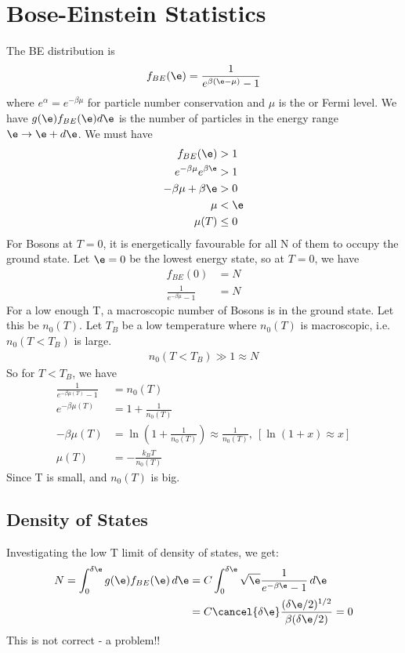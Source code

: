 \documentclass[a4paper, 11pt, normalem]{report}
\begin{document}
\section{Bose-Einstein Statistics}
The BE distribution is
\begin{equation}
    f_{BE}(\e) = \frac{1}{e^{\beta(\e-\mu)}-1}
\end{equation}
where $e^{\alpha} = e^{-\beta\mu}$ for particle number conservation and $\mu$ is the  or Fermi level.
We have $g(\e)f_{BE}(\e)d\e$ is the number of particles in the energy range $\e \to \e+d\e$.
We must have
\begin{align}
    f_{BE}(\e) &> 1 \\
    e^{-\beta\mu}e^{\beta\e} &> 1 \\
    -\beta\mu + \beta\e &> 0 \\
    \mu &< \e \\
    \mu(T) &\leq 0
\end{align}
For Bosons at $T=0$, it is energetically favourable for all N of them to occupy the ground state.
Let $\e=0$ be the lowest energy state, so at $T=0$, we have
\begin{align}
    f_{BE}(0) &= N \\
    \frac{1}{e^{-\beta\mu}-1} &= N
\end{align}
For a low enough T, a macroscopic number of Bosons is in the ground state. 
Let this be $n_0(T)$.
Let $T_B$ be a low temperature where $n_0(T)$ is macroscopic, i.e. $n_0(T<T_B)$ is large.
\begin{align}
    n_0(T<T_B) \gg 1 \approx N
\end{align}
So for $T < T_B$, we have
\begin{align}
    \frac{1}{e^{-\beta\mu(T)}-1} &= n_0(T) \\
    e^{-\beta\mu(T)} &= 1 + \frac{1}{n_0(T)} \\
    -\beta\mu(T) &= \ln\left(1+\frac{1}{n_0(T)}\right) \approx \frac{1}{n_0(T)}, ~ [\ln(1+x) \approx x] \\
    \mu(T) &= -\frac{k_BT}{n_0(T)}
\end{align}
Since T is small, and $n_0(T)$ is big.

\subsection{Density of States}
Investigating the low T limit of density of states, we get:
\begin{align}
    N = \int_0^{\delta\e} g(\e)f_{BE}(\e)\,d\e &= C\int_0^{\delta\e} \sqrt{\e} \frac{1}{e^{-\beta\e} -1}\,d\e \\
                                               &= C\cancel{\delta\e}\frac{(\delta\e/2)^{1/2}}{\beta(\delta\e/2)} = 0
\end{align}
This is not correct - a problem!!
\end{document}
